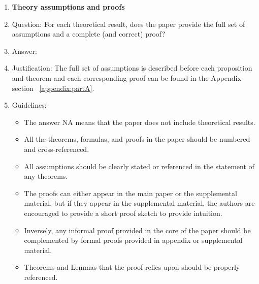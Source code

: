 \documentclass{article}
\begin{document}
\begin{enumerate}
\item {\bf Theory assumptions and proofs}
    \item[] Question: For each theoretical result, does the paper provide the full set of assumptions and a complete (and correct) proof?
    \item[] Answer: \answerYes{} %
    \item[] Justification: The full set of assumptions is described before each proposition and theorem and each corresponding proof can be found in the Appendix section ~\ref{appendix:partA}.
    \item[] Guidelines:
    \begin{itemize}
        \item The answer NA means that the paper does not include theoretical results. 
        \item All the theorems, formulas, and proofs in the paper should be numbered and cross-referenced.
        \item All assumptions should be clearly stated or referenced in the statement of any theorems.
        \item The proofs can either appear in the main paper or the supplemental material, but if they appear in the supplemental material, the authors are encouraged to provide a short proof sketch to provide intuition. 
        \item Inversely, any informal proof provided in the core of the paper should be complemented by formal proofs provided in appendix or supplemental material.
        \item Theorems and Lemmas that the proof relies upon should be properly referenced. 
    \end{itemize}


\end{enumerate}
\end{document}
